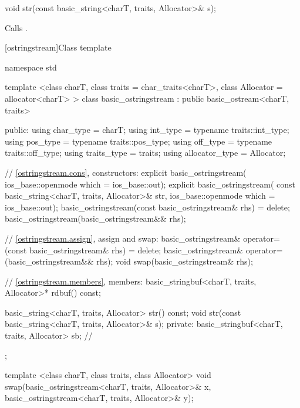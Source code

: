 %
%
\begin{itemdecl}
void str(const basic_string<charT, traits, Allocator>& s);
\end{itemdecl}

\begin{itemdescr}
\pnum
\effects
Calls
.
\end{itemdescr}

[ostringstream]{Class template }

%
\begin{codeblock}
namespace std {
  template <class charT, class traits = char_traits<charT>,
            class Allocator = allocator<charT> >
  class basic_ostringstream
    : public basic_ostream<charT, traits> {
  public:
    using char_type      = charT;
    using int_type       = typename traits::int_type;
    using pos_type       = typename traits::pos_type;
    using off_type       = typename traits::off_type;
    using traits_type    = traits;
    using allocator_type = Allocator;

    // \ref{ostringstream.cons}, constructors:
    explicit basic_ostringstream(
      ios_base::openmode which = ios_base::out);
    explicit basic_ostringstream(
      const basic_string<charT, traits, Allocator>& str,
      ios_base::openmode which = ios_base::out);
    basic_ostringstream(const basic_ostringstream& rhs) = delete;
    basic_ostringstream(basic_ostringstream&& rhs);

    // \ref{ostringstream.assign}, assign and swap:
    basic_ostringstream& operator=(const basic_ostringstream& rhs) = delete;
    basic_ostringstream& operator=(basic_ostringstream&& rhs);
    void swap(basic_ostringstream& rhs);

    // \ref{ostringstream.members}, members:
    basic_stringbuf<charT, traits, Allocator>* rdbuf() const;

    basic_string<charT, traits, Allocator> str() const;
    void str(const basic_string<charT, traits, Allocator>& s);
   private:
    basic_stringbuf<charT, traits, Allocator> sb; // \expos
  };

  template <class charT, class traits, class Allocator>
    void swap(basic_ostringstream<charT, traits, Allocator>& x,
              basic_ostringstream<charT, traits, Allocator>& y);
}
\end{codeblock}

